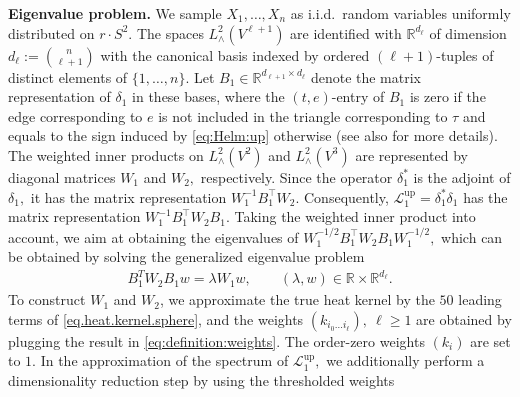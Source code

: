 \documentclass[10pt]{article}
\DeclareMathOperator{\up}{up}
\theoremstyle{plain}
\theoremstyle{definition}
\theoremstyle{remark}
\begin{document}
\noindent\textbf{Eigenvalue problem.} We sample $X_1, \dots, X_n$ as i.i.d.\ random variables uniformly distributed on $r\cdot S^2.$ The spaces $L^2_{\wedge}(V^{\ell + 1})$ are identified with $\mathbb{R}^{d_\ell}$ of dimension $d_\ell:={ n\choose \ell + 1}$ with the canonical basis indexed by ordered $(\ell + 1)$-tuples of distinct elements of $\{1, \dots, n\}.$ Let $B_1 \in \mathbb{R}^{d_{\ell +1} \times d_\ell}$ denote the matrix representation of $\delta_1$ in these bases, where the $(t,e)$-entry of $B_1$ is zero if the edge corresponding to $e$ is not included in the triangle corresponding to $\tau$ and equals to the sign induced by \eqref{eq:Helm:up} otherwise (see also \cite{Lim20, doi:10.1137/22M1482299, MR4164275} for more details). The weighted inner products on $L^2_{\wedge}(V^2)$ and $L^2_{\wedge}(V^3)$ are represented by diagonal matrices $W_1$ and $W_2,$ respectively. Since the operator $\delta_1^*$ is the adjoint of $\delta_1,$ it has the matrix representation $W_1^{-1}B_1^\top W_2$. Consequently, $\mathscr{L}_1^{\up}=\delta_1^*\delta_1$ has the matrix representation $W_1^{-1}B_1^\top W_2B_1$. Taking the weighted inner product into account, we aim at obtaining the eigenvalues of $W_1^{-1/2}B_1^\top W_2B_1W_1^{-1/2},$ which can be obtained by solving the generalized eigenvalue problem
\begin{align}
    \label{eq.gen.ev.problem}
    B_1^TW_2B_1w = \lambda W_1w, \qquad (\lambda, w) \in \mathbb{R}\times \mathbb{R}^{d_{\ell}}.
\end{align}
 To construct $W_1$ and $W_2$, we approximate the true heat kernel by the $50$ leading terms of \eqref{eq.heat.kernel.sphere}, and the weights $(k_{i_0\dots i_{\ell}}), \ \ell \geq 1$ are obtained by plugging the result in \eqref{eq:definition:weights}. The order-zero weights $(k_i)$ are set to $1.$ In the approximation of the spectrum of $\mathscr{L}_1^{\up},$ we additionally perform a dimensionality reduction step by using the thresholded weights
\end{document}
